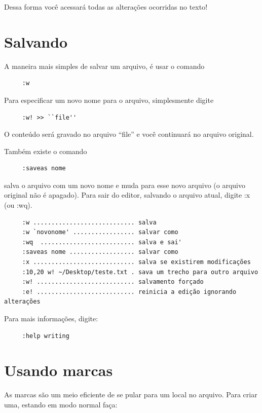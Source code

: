 \documentclass[10pt,a4paper,openany]{book}
\begin{document}
Dessa forma você acessará todas as alterações ocorridas no texto!

\section{Salvando}

A maneira mais simples de salvar um arquivo, é usar o comando

\begin{verbatim}
     :w
\end{verbatim}


Para especificar um novo nome para o arquivo, simplesmente digite

\begin{verbatim}
     :w! >> ``file''
\end{verbatim}

O conteúdo será gravado no arquivo ``file'' e você continuará no arquivo original.

Também existe o comando

\begin{verbatim}
     :saveas nome
\end{verbatim}

salva o arquivo com um novo nome e muda para esse novo arquivo (o arquivo original não é apagado).
Para sair do editor, salvando o arquivo atual, digite :x (ou :wq).

\begin{verbatim}
     :w ............................ salva
     :w `novonome' ................. salvar como
     :wq  .......................... salva e sai'
     :saveas nome .................. salvar como
     :x ............................ salva se existirem modificações
     :10,20 w! ~/Desktop/teste.txt . sava um trecho para outro arquivo
     :w! ........................... salvamento forçado
     :e! ........................... reinicia a edição ignorando alterações
\end{verbatim}

Para mais informações, digite:

\begin{verbatim}
     :help writing
\end{verbatim}

\section{Usando marcas}
\label{sec:Usando marcas}

As marcas são um meio eficiente de se pular para um local no arquivo. Para
criar uma,  estando em modo normal faça:
\end{document}
